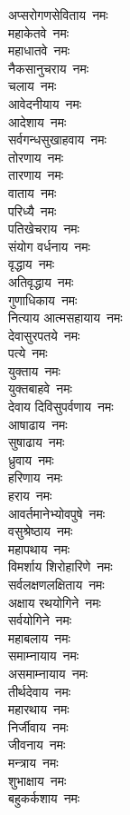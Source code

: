 \begin{multicols}{2}
\begin{flushleft}
अप्सरोगणसेविताय~नमः\\
महाकेतवे~नमः\\
महाधातवे~नमः\\
नैकसानुचराय~नमः\\
चलाय~नमः\hfill{}\\
आवेदनीयाय~नमः\\
आदेशाय~नमः\\
सर्वगन्धसुखाहवाय~नमः\\
तोरणाय~नमः\\
तारणाय~नमः\\
वाताय~नमः\\
परिध्यै~नमः\\
पतिखेचराय~नमः\\
संयोग वर्धनाय~नमः\\
वृद्धाय~नमः\hfill{}\\
अतिवृद्धाय~नमः\\
गुणाधिकाय~नमः\\
नित्याय आत्मसहायाय~नमः\\
देवासुरपतये~नमः\\
पत्ये~नमः\\
युक्ताय~नमः\\
युक्तबाहवे~नमः\\
देवाय दिविसुपर्वणाय~नमः\\
आषाढाय~नमः\\
सुषाढाय~नमः\hfill{}\\
ध्रुवाय~नमः\\
हरिणाय~नमः\\
हराय~नमः\\
आवर्तमानेभ्योवपुषे~नमः\\
वसुश्रेष्ठाय~नमः\\
महापथाय~नमः\\
विमर्शाय शिरोहारिणे~नमः\\
सर्वलक्षणलक्षिताय~नमः\\
अक्षाय रथयोगिने~नमः\\
सर्वयोगिने~नमः\hfill{}\\
महाबलाय~नमः\\
समाम्नायाय~नमः\\
असमाम्नायाय~नमः\\
तीर्थदेवाय~नमः\\
महारथाय~नमः\\
निर्जीवाय~नमः\\
जीवनाय~नमः\\
मन्त्राय~नमः\\
शुभाक्षाय~नमः\\
बहुकर्कशाय~नमः\hfill{}\\

\end{flushleft}
\end{multicols}
